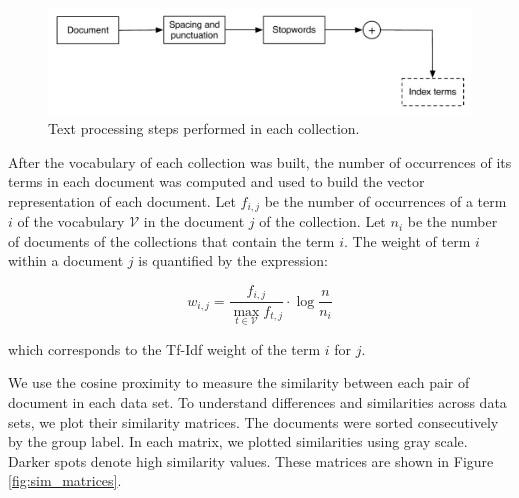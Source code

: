 \documentclass[preprint,12pt,authoryear,review]{elsarticle}
\begin{document}
\begin{figure}[!htbp]
\centering
  \includegraphics[scale=0.7]
  {text_processing_steps.pdf}
  \caption{Text processing steps performed in each collection.}
  \label{fig:text_processing}
\end{figure}

After the vocabulary of each collection was built, the number of occurrences of its terms in each document was computed and used to build the vector representation of each document. 
Let $f_{i,j}$ be the number of occurrences of a term $i$ of the vocabulary $\mathcal{V}$ in the document $j$ of the collection.
Let $n_{i}$ be the number of documents of the collections that contain the term $i$.
The weight of term $i$ within a document $j$ is quantified by the expression:

\[w_{i,j}=\frac{f_{i,j}}{ \operatorname*{max}_{t\in \mathcal{V}}f_{t,j} }\cdot\log\frac{n}{n_{i}}\] 

which corresponds to the Tf-Idf weight of the term $i$ for $j$.

We use the cosine proximity to measure the similarity between each pair of document in each data set. 
To understand differences and similarities across data sets, we plot their similarity matrices.
The documents were sorted consecutively by the group label. 
In each matrix, we plotted similarities using gray scale. 
Darker spots denote high similarity values. 
These matrices are shown in Figure \ref{fig:sim_matrices}. 
\end{document}
